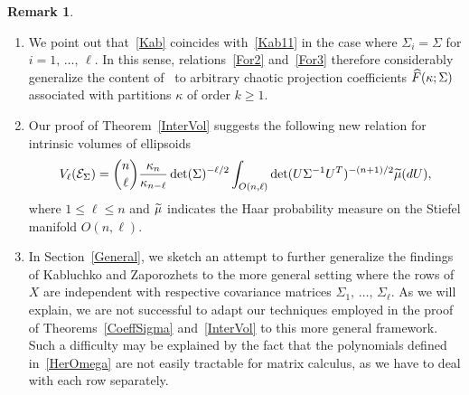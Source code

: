 \documentclass[10pt]{amsart}
\theoremstyle{definition}\newtheorem{defi}[theo]{Definition}\newtheorem{rema}[theo]{Remark}\newtheorem{exam}[theo]{Example}\newtheorem{exem}[theo]{Example}\newtheorem{nota}[theo]{Notation}
\newcommand{\clE}{\mathcal{E}}
\newcommand*{\alphenumi}{\renewcommand*{\theenumi}{\alph{enumi}}}
\let\oldtilde\tilde
\renewcommand*{\tilde}[1]{\mathchoice{\widetilde{#1}}{\widetilde{#1}}{\oldtilde{#1}}{\oldtilde{#1}}}
\let\oldhat\hat
\renewcommand*{\hat}[1]{\mathchoice{\widehat{#1}}{\widehat{#1}}{\oldhat{#1}}{\oldhat{#1}}}
\begin{document}
\begin{rema}\leavevmode
\begin{enumerate}\alphenumi
\item We point out that~\eqref{Kab} coincides with~\eqref{Kab11} in the case where $\Sigma_i=\Sigma$ for $i=1,\,\ldots,\,\ell$. In this sense, relations~\eqref{For2} and~\eqref{For3} therefore considerably generalize the content of~\cite[Theorem~1.1]{Kab14} to arbitrary chaotic projection coefficients $\hat{F}(\kappa;\Sigma)$ associated with partitions $\kappa$ of order $k \geq 1$.
\item Our proof of Theorem~\ref{InterVol} suggests the following new relation for intrinsic volumes of ellipsoids
\begin{gather*}
V_{\ell}(\clE_{\Sigma})= \binom{n}{\ell}\frac{\kappa_n}{\kappa_{n-\ell}}\det(\Sigma)^{-\ell/2}
\int_{O(n,\ell)} \det(U\Sigma^{-1}U^T)^{-(n+1)/2} \tilde{\mu}(dU),
\end{gather*}
where $1\leq \ell \leq n$ and $\tilde{\mu}$ indicates the Haar probability measure on the Stiefel manifold $O(n,\ell)$.
\item In Section~\ref{General}, we sketch an attempt to further generalize the findings of Kabluchko and Zaporozhets to the more general setting where the rows of $X$ are independent with respective covariance matrices $\Sigma_1,\,\ldots,\,\Sigma_{\ell}$. As we will explain, we are not successful to adapt our techniques employed in the proof of Theorems~\ref{CoeffSigma} and~\ref{InterVol} to this more general framework. Such a difficulty may be explained by the fact that the polynomials defined in~\eqref{HerOmega} are not easily tractable for matrix calculus, as we have to deal with each row separately.
\end{enumerate}
\end{rema}
\end{document}
